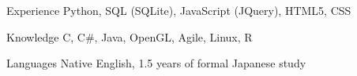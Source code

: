 

\begin{cvskills}

  \cvskill
    {Experience} %
    {Python, SQL (SQLite), JavaScript (JQuery), HTML5, CSS} %

  \cvskill
    {Knowledge} %
    {C, C\#, Java, OpenGL, Agile, Linux, R} %

  \cvskill
    {Languages} %
    {Native English, 1.5 years of formal Japanese study} %

\end{cvskills}
